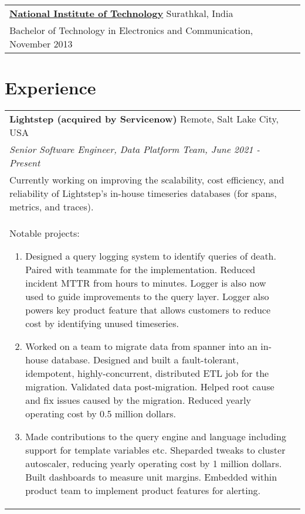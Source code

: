\documentclass[margin,line]{res}
\begin{document}
\begin{resume}
 \vspace{-7pt}
 \begin{tabular}{@{}p{5.5in}p{4in}}
 {\bf \href{http://www.ece.nitk.ac.in/}{National Institute of
 Technology}} \dotfill Surathkal, India
 \\ {\small Bachelor of Technology in Electronics and Communication, November 2013}
 \end{tabular}

\section{\sc Experience}
\begin{tabular}{@{}p{5.5in}p{4in}}
{\bf Lightstep (acquired by Servicenow)} \dotfill Remote, Salt Lake City, USA \\
{\small\em Senior Software Engineer, Data Platform Team, June 2021 - Present} \\
{\small Currently working on improving the scalability, cost efficiency,
and reliability of Lightstep's in-house timeseries databases (for spans,
metrics, and traces).} \\

\vspace{-1pt}
{\small
Notable projects:
\begin{enumerate}
\item Designed a query logging system to identify queries of death.
Paired with teammate for the implementation. Reduced incident
MTTR from hours to minutes. Logger is also now
used to guide improvements to the query layer. Logger also powers key
product feature that allows customers to reduce cost by identifying unused
timeseries.
\item Worked on a team to migrate data from spanner into an in-house
database. Designed and built a fault-tolerant, idempotent, highly-concurrent,
distributed ETL job for the migration. Validated data post-migration.
Helped root cause and fix issues caused by the migration.
Reduced yearly operating cost by 0.5 million dollars.
\item Made contributions to the query engine and language including
support for template variables etc. Sheparded tweaks to cluster
autoscaler, reducing yearly operating cost by 1 million dollars.
Built dashboards to measure unit margins. Embedded within product team
to implement product features for alerting.
\end{enumerate}
}\\
\end{tabular}


\end{resume}
\end{document}
